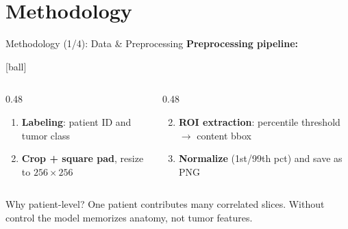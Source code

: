 \documentclass[aspectratio=169]{beamer}
\begin{document}
\section{Methodology}
\begin{frame}{Methodology (1/4): Data \& Preprocessing}
  \footnotesize
  \textbf{Preprocessing pipeline:}
  {[ball]
  \begin{columns}
    \begin{column}{0.48\textwidth}
      \begin{enumerate}
        \item \textbf{Labeling}: patient ID and tumor class
        \setcounter{enumi}{2}
        \item \textbf{Crop + square pad}, resize to $256\times256$
      \end{enumerate}
    \end{column}
    \begin{column}{0.48\textwidth}
      \begin{enumerate}
        \setcounter{enumi}{1}
        \item \textbf{ROI extraction}: percentile threshold $\to$ content bbox
        \setcounter{enumi}{3}
        \item \textbf{Normalize} (1st/99th pct) and save as PNG
      \end{enumerate}
    \end{column}
  \end{columns}
  }

  \vspace{0.3em}
  \begin{block}{Why patient-level?}
    \scriptsize One patient contributes many correlated slices.
    Without control the model memorizes anatomy, not tumor features.
  \end{block}


\end{frame}
\end{document}
